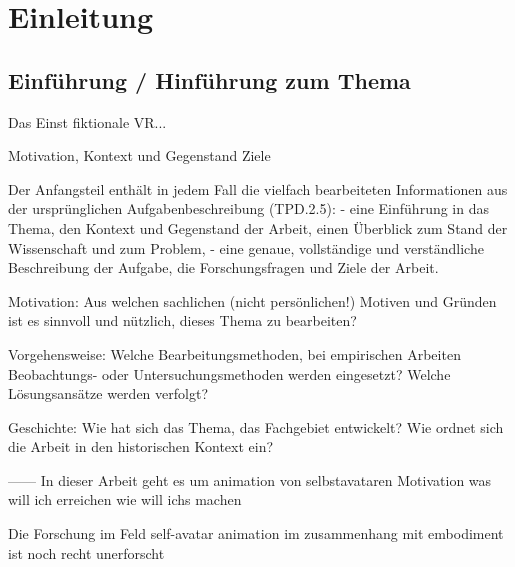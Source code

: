 \chapter{Einleitung}

\section{Einführung / Hinführung zum Thema}
Das Einst fiktionale VR...

Motivation, Kontext und Gegenstand
Ziele

Der Anfangsteil enthält in jedem Fall die vielfach bearbeiteten Informationen aus der
ursprünglichen Aufgabenbeschreibung (TPD.2.5):
- eine Einführung in das Thema, den Kontext und Gegenstand der Arbeit, einen
Überblick zum Stand der Wissenschaft und zum Problem,
- eine genaue, vollständige und verständliche Beschreibung der Aufgabe, die Forschungsfragen und Ziele der Arbeit.

Motivation: Aus welchen sachlichen (nicht persönlichen!) Motiven und Gründen ist es
sinnvoll und nützlich, dieses Thema zu bearbeiten?

Vorgehensweise: Welche Bearbeitungsmethoden, bei empirischen Arbeiten Beobachtungs- oder Untersuchungsmethoden werden eingesetzt? Welche Lösungsansätze werden verfolgt?

Geschichte: Wie hat sich das Thema, das Fachgebiet entwickelt? Wie ordnet sich die
Arbeit in den historischen Kontext ein?

------
In dieser Arbeit geht es um animation von selbstavataren
Motivation
was will ich erreichen
wie will ichs machen

Die Forschung im Feld self-avatar animation im zusammenhang mit embodiment ist noch recht unerforscht


